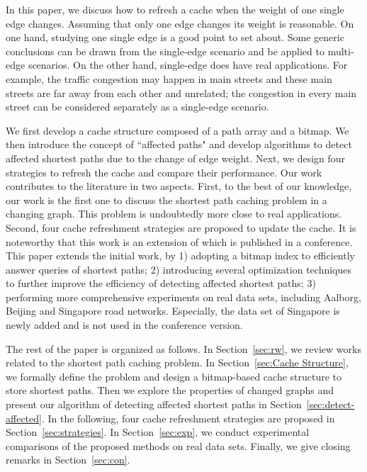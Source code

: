 In this paper, we discuss how to refresh a cache when the weight of one single edge changes.
Assuming that only one edge changes its weight is reasonable.
On one hand, studying one single edge is a good point to set about.
Some generic conclusions can be drawn from the single-edge scenario and be applied to multi-edge scenarios.
On the other hand, single-edge does have real applications. For example, the traffic congestion may happen in main streets and these main streets are far away from each other and unrelated; the congestion in every main street can be considered separately as a single-edge scenario.

We first develop a cache structure composed of a path array and a bitmap. We then introduce the concept of ``affected paths" and develop algorithms to detect affected shortest paths due to the change of edge weight.
Next, we design four strategies to refresh the cache and compare their performance.
Our work contributes to the literature in two aspects. First, to the best of our knowledge, our work is the first one to discuss the shortest path caching problem in a changing graph.
This problem is undoubtedly more close to real applications.
Second, four cache refreshment strategies are proposed to update the cache. It is noteworthy that this work is an extension of \cite{Li2014refreshment} which is published in a conference.
This paper extends the initial work, by 1) adopting a bitmap index to efficiently answer queries of shortest paths; 2) introducing several optimization techniques to further improve the efficiency of detecting affected shortest paths; 3) performing more comprehensive experiments on real data sets, including Aalborg, Beijing and Singapore road networks. Especially, the data set of Singapore is newly added and is not used in the conference version.


The rest of the paper is organized as follows. In Section~\ref{sec:rw}, we review works related to the shortest path caching problem.
In Section~\ref{sec:Cache Structure}, we formally define the problem and design a bitmap-based cache structure to store shortest paths.
Then we explore the properties of changed graphs and present our algorithm of detecting affected shortest paths in Section~\ref{sec:detect-affected}.
In the following, four cache refreshment strategies are proposed in Section~\ref{sec:strategies}.
In Section~\ref{sec:exp}, we conduct experimental comparisons of the proposed methods on real data sets.
Finally, we give closing remarks in Section~\ref{sec:con}.


